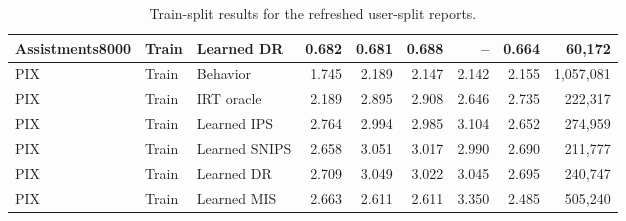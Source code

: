 \begin{table}[t]
{\begin{tabular}{lllrrrrrr}
Assistments8000 & Train & Learned DR & 0.682 & 0.681 & 0.688 & -- & 0.664 & 60,172 \\
\midrule
PIX & Train & Behavior & 1.745 & 2.189 & 2.147 & 2.142 & 2.155 & 1,057,081 \\
PIX & Train & IRT oracle & 2.189 & 2.895 & 2.908 & 2.646 & 2.735 & 222,317 \\
PIX & Train & Learned IPS & 2.764 & 2.994 & 2.985 & 3.104 & 2.652 & 274,959 \\
PIX & Train & Learned SNIPS & 2.658 & 3.051 & 3.017 & 2.990 & 2.690 & 211,777 \\
PIX & Train & Learned DR & 2.709 & 3.049 & 3.022 & 3.045 & 2.695 & 240,747 \\
PIX & Train & Learned MIS & 2.663 & 2.611 & 2.611 & 3.350 & 2.485 & 505,240 \\
\bottomrule
\end{tabular}
}
\caption{Train-split results for the refreshed user-split reports.}
\label{tab:train_test_results_train}
\end{table}

